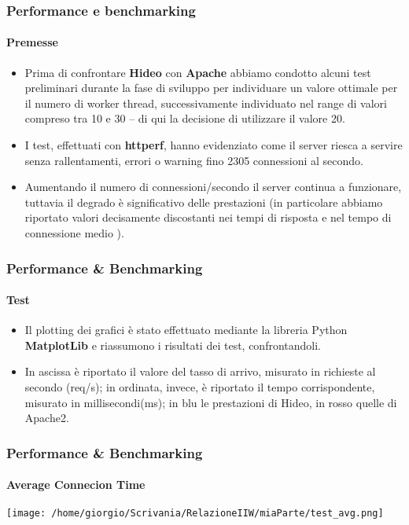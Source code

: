 \documentclass{beamer}
\begin{document}
\begin{frame}
\frametitle{Performance e benchmarking}
\framesubtitle{Premesse}

\begin{itemize}
\item Prima di confrontare \textbf{Hideo} con \textbf{Apache} abbiamo condotto alcuni test preliminari
durante la fase di sviluppo per individuare un valore ottimale per il numero di
worker thread, successivamente individuato nel range di valori compreso tra 10 e
30 – di qui la decisione di utilizzare il valore 20.

\item I test, effettuati con \textbf{httperf}, hanno evidenziato come il server riesca a servire
senza rallentamenti, errori o warning fino 2305 connessioni al secondo.

\item Aumentando il numero di connessioni/secondo il server continua a funzionare,
tuttavia il degrado è significativo delle prestazioni (in particolare abbiamo
riportato valori decisamente discostanti nei tempi di risposta e nel tempo di
connessione medio ).
\end{itemize}
\end{frame}




\begin{frame}
\frametitle{Performance \& Benchmarking}
\framesubtitle{Test}

\begin{itemize}
\item Il plotting dei grafici è stato effettuato mediante la libreria Python \textbf{MatplotLib} e
riassumono i risultati dei test, confrontandoli.
\item In ascissa è riportato il valore del tasso di arrivo, misurato in richieste al secondo
(req/s); in ordinata, invece, è riportato il tempo corrispondente, misurato in
millisecondi(ms); in blu le prestazioni di Hideo, in rosso quelle di Apache2.
\end{itemize}

\end{frame}

\begin{frame}
\frametitle{Performance \& Benchmarking}
\framesubtitle{Average Connecion Time}
\begin{center}


\texttt{[image: /home/giorgio/Scrivania/RelazioneIIW/miaParte/test\_avg.png]}
\end{center}
\end{frame}
\end{document}
